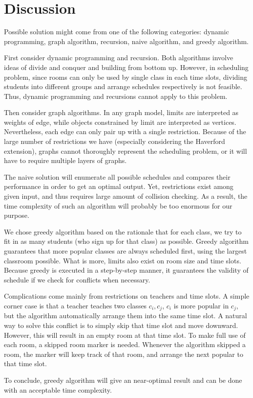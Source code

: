 \documentclass[11pt, oneside]{article}   	%
\begin{document}
\section{Discussion}
Possible solution might come from one of the following categories:  dynamic programming, graph algorithm, recursion, naive algorithm, and greedy algorithm. 
\par First consider dynamic programming and recursion. Both algorithms involve ideas of divide and conquer and building from bottom up. However, in scheduling problem, since rooms can only be used by single class in each time slots, dividing students into different groups and arrange schedules respectively is not feasible. Thus, dynamic programming and recursions cannot apply to this problem.\par
Then consider graph algorithms. In any graph model, limits are interpreted as weights of edge, while objects constrained by limit are interpreted as vertices. Nevertheless, each edge can only pair up with a single restriction. Because of the large number of restrictions we have (especially considering the Haverford extension), graphs cannot thoroughly represent the scheduling problem, or it will have to require multiple layers of graphs. \par
The naive solution will enumerate all possible schedules and compares their performance in order to get an optimal output. Yet, restrictions exist among given input, and thus requires large amount of collision checking. As a result, the time complexity of such an algorithm will probably be too enormous for our purpose.\par
We chose greedy algorithm based on the rationale that for each class, we try to fit in as many students (who sign up for that class) as possible. Greedy algorithm guarantees that more popular classes are always scheduled first, using the largest classroom possible. What is more, limits also exist on room size and time slots. Because greedy is executed in a step-by-step manner, it guarantees the validity of schedule if we check for conflicts when necessary.
\par Complications come mainly from restrictions on teachers and time slots. A simple corner case is that a teacher teaches two classes $c_i,c_j$, $c_i$ is more popular in $c_j$, but the algorithm automatically arrange them into the same time slot. A natural way to solve this conflict is to simply skip that time slot and move downward. However, this will result in an empty room at that time slot. To make full use of each room, a skipped room marker is needed. Whenever the algorithm skipped a room, the marker will keep track of that room, and arrange the next popular to that time slot.
\par To conclude, greedy algorithm will give an near-optimal result and can be done with an acceptable time complexity.
 
\end{document}
